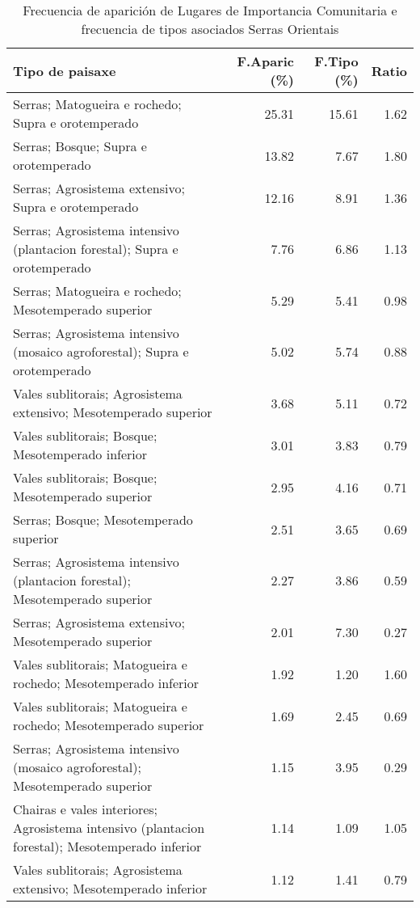 \begin{table}[p]
\centering
\caption{Frecuencia de aparición de Lugares de Importancia Comunitaria e frecuencia de tipos asociados Serras Orientais} 
\label{vnatura5}
\begin{tabular}{lrrr}
  \hline
Tipo de paisaxe & F.Aparic (\%) & F.Tipo (\%) & Ratio \\ 
  \hline
Serras; Matogueira e rochedo; Supra e orotemperado & 25.31 & 15.61 & 1.62 \\ 
  Serras; Bosque; Supra e orotemperado & 13.82 & 7.67 & 1.80 \\ 
  Serras; Agrosistema extensivo; Supra e orotemperado & 12.16 & 8.91 & 1.36 \\ 
  Serras; Agrosistema intensivo (plantacion forestal); Supra e orotemperado & 7.76 & 6.86 & 1.13 \\ 
  Serras; Matogueira e rochedo; Mesotemperado superior & 5.29 & 5.41 & 0.98 \\ 
  Serras; Agrosistema intensivo (mosaico agroforestal); Supra e orotemperado & 5.02 & 5.74 & 0.88 \\ 
  Vales sublitorais; Agrosistema extensivo; Mesotemperado superior & 3.68 & 5.11 & 0.72 \\ 
  Vales sublitorais; Bosque; Mesotemperado inferior & 3.01 & 3.83 & 0.79 \\ 
  Vales sublitorais; Bosque; Mesotemperado superior & 2.95 & 4.16 & 0.71 \\ 
  Serras; Bosque; Mesotemperado superior & 2.51 & 3.65 & 0.69 \\ 
  Serras; Agrosistema intensivo (plantacion forestal); Mesotemperado superior & 2.27 & 3.86 & 0.59 \\ 
  Serras; Agrosistema extensivo; Mesotemperado superior & 2.01 & 7.30 & 0.27 \\ 
  Vales sublitorais; Matogueira e rochedo; Mesotemperado inferior & 1.92 & 1.20 & 1.60 \\ 
  Vales sublitorais; Matogueira e rochedo; Mesotemperado superior & 1.69 & 2.45 & 0.69 \\ 
  Serras; Agrosistema intensivo (mosaico agroforestal); Mesotemperado superior & 1.15 & 3.95 & 0.29 \\ 
  Chairas e vales interiores; Agrosistema intensivo (plantacion forestal); Mesotemperado inferior & 1.14 & 1.09 & 1.05 \\ 
  Vales sublitorais; Agrosistema extensivo; Mesotemperado inferior & 1.12 & 1.41 & 0.79 \\ 
   \hline
\end{tabular}
\end{table}
